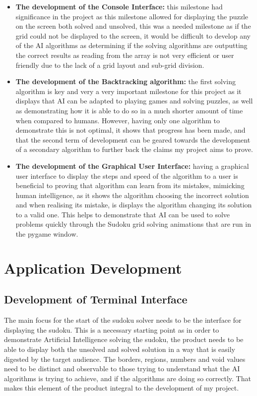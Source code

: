 \documentclass[]{final_report}
\begin{document}
\begin{itemize} 
    \item \textbf{The development of the Console Interface:} this milestone had significance in the project as this milestone allowed for displaying the puzzle on the screen both solved and unsolved, this was a needed milestone as if the grid could not be displayed to the screen, it would be difficult to develop any of the AI algorithms as determining if the solving algorithms are outputting the correct results as reading from the array is not very efficient or user friendly due to the lack of a grid layout and sub-grid division. 

    \item \textbf{The development of the Backtracking algorithm:} the first solving algorithm is key and very a very important milestone for this project as it displays that AI can be adapted to playing games and solving puzzles, as well as demonstrating how it is able to do so in a much shorter amount of time when compared to humans. However, having only one algorithm to demonstrate this is not optimal, it shows that progress has been made, and that the second term of development can be geared towards the development of a secondary algorithm to further back the claims my project aims to prove. 

    \item \textbf{The development of the Graphical User Interface:} having a graphical user interface to display the steps and speed of the algorithm to a user is beneficial to proving that algorithm can learn from its mistakes, mimicking human intelligence, as it shows the algorithm choosing the incorrect solution and when realising its mistake, is displays the algorithm changing its solution to a valid one. This helps to demonstrate that AI can be used to solve problems quickly through the Sudoku grid solving animations that are run in the pygame window.
\end{itemize}

\chapter{Application Development}
\section{Development of Terminal Interface}

The main focus for the start of the sudoku solver needs to be the interface for displaying the sudoku. This is a necessary starting point as in order to demonstrate Artificial Intelligence solving the sudoku, the product needs to be able to display both the unsolved and solved solution in a way that is easily digested by the target audience. The borders, regions, numbers and void values need to be distinct and observable to those trying to understand what the AI algorithms is trying to achieve, and if the algorithms are doing so correctly. That makes this element of the product integral to the development of my project. 
\end{document}
